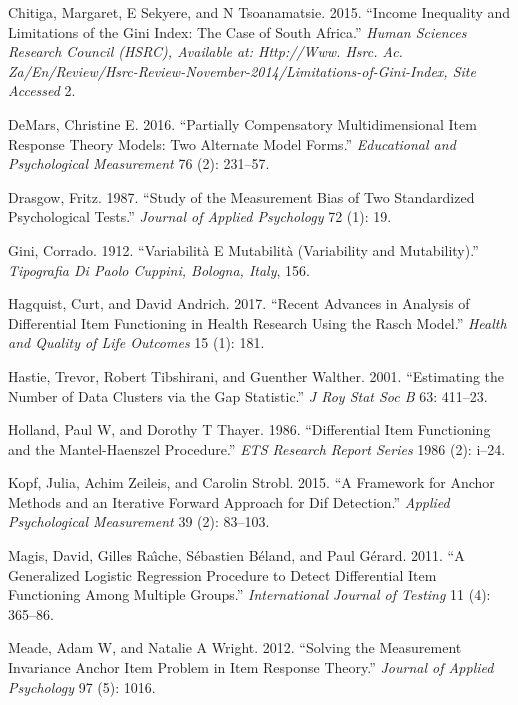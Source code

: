 \documentclass[
  11pt,
]{article}
\begin{document}
\leavevmode\hypertarget{ref-chitiga2015income}{}%
Chitiga, Margaret, E Sekyere, and N Tsoanamatsie. 2015. ``Income Inequality and Limitations of the Gini Index: The Case of South Africa.'' \emph{Human Sciences Research Council (HSRC), Available at: Http://Www. Hsrc. Ac. Za/En/Review/Hsrc-Review-November-2014/Limitations-of-Gini-Index, Site Accessed} 2.

\leavevmode\hypertarget{ref-demars2016partially}{}%
DeMars, Christine E. 2016. ``Partially Compensatory Multidimensional Item Response Theory Models: Two Alternate Model Forms.'' \emph{Educational and Psychological Measurement} 76 (2): 231--57.

\leavevmode\hypertarget{ref-drasgow1987study}{}%
Drasgow, Fritz. 1987. ``Study of the Measurement Bias of Two Standardized Psychological Tests.'' \emph{Journal of Applied Psychology} 72 (1): 19.

\leavevmode\hypertarget{ref-gini1912variabilita}{}%
Gini, Corrado. 1912. ``Variabilità E Mutabilità (Variability and Mutability).'' \emph{Tipografia Di Paolo Cuppini, Bologna, Italy}, 156.

\leavevmode\hypertarget{ref-hagquist2017recent}{}%
Hagquist, Curt, and David Andrich. 2017. ``Recent Advances in Analysis of Differential Item Functioning in Health Research Using the Rasch Model.'' \emph{Health and Quality of Life Outcomes} 15 (1): 181.

\leavevmode\hypertarget{ref-hastie2001estimating}{}%
Hastie, Trevor, Robert Tibshirani, and Guenther Walther. 2001. ``Estimating the Number of Data Clusters via the Gap Statistic.'' \emph{J Roy Stat Soc B} 63: 411--23.

\leavevmode\hypertarget{ref-holland1986differential}{}%
Holland, Paul W, and Dorothy T Thayer. 1986. ``Differential Item Functioning and the Mantel-Haenszel Procedure.'' \emph{ETS Research Report Series} 1986 (2): i--24.

\leavevmode\hypertarget{ref-kopf2015framework}{}%
Kopf, Julia, Achim Zeileis, and Carolin Strobl. 2015. ``A Framework for Anchor Methods and an Iterative Forward Approach for Dif Detection.'' \emph{Applied Psychological Measurement} 39 (2): 83--103.

\leavevmode\hypertarget{ref-magis2011generalized}{}%
Magis, David, Gilles Raı̂che, Sébastien Béland, and Paul Gérard. 2011. ``A Generalized Logistic Regression Procedure to Detect Differential Item Functioning Among Multiple Groups.'' \emph{International Journal of Testing} 11 (4): 365--86.

\leavevmode\hypertarget{ref-meade2012solving}{}%
Meade, Adam W, and Natalie A Wright. 2012. ``Solving the Measurement Invariance Anchor Item Problem in Item Response Theory.'' \emph{Journal of Applied Psychology} 97 (5): 1016.
\end{document}
